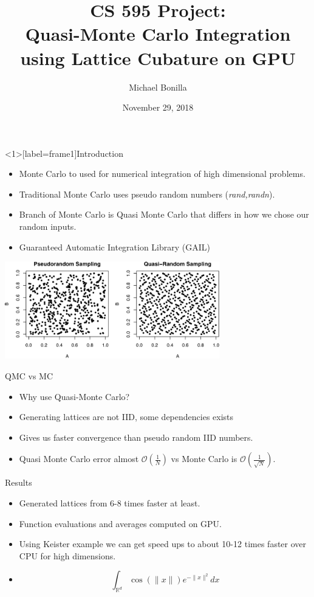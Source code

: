 \documentclass[11pt]{beamer}
\author{Michael Bonilla}
\title{CS 595 Project: \\ Quasi-Monte Carlo Integration using
Lattice Cubature on GPU}
\date{November 29, 2018}
\begin{document}
\nocite{*}
\begin{frame}
\titlepage
\end{frame}


\begin{frame}<1>[label=frame1]{Introduction}
\begin{itemize}
\item Monte Carlo to used for numerical integration of high dimensional problems.
\item Traditional Monte Carlo uses pseudo random numbers (\textit{rand,randn}).
\item Branch of Monte Carlo is Quasi Monte Carlo that differs in how we chose our random inputs.
\item Guaranteed Automatic Integration Library (GAIL)
\end{itemize}
\end{frame}

\begin{frame}
\centering
\includegraphics[width=0.7\textwidth]{pvsq.png} 
\end{frame}

\begin{frame}{QMC vs MC}
\begin{itemize}
\item Why use Quasi-Monte Carlo?
\item Generating lattices are not IID, some dependencies exists
\item Gives us faster convergence than pseudo random IID numbers.
\item Quasi Monte Carlo error almost $\mathcal{O}(\frac{1}{N})$ vs Monte Carlo is $\mathcal{O}(\frac{1}{\sqrt{N}})$.
\end{itemize}
\end{frame}

\begin{frame}{Results}%
\begin{itemize}
\item Generated lattices from 6-8 times faster at least.
\item Function evaluations and averages computed on GPU.
\item Using Keister example we can get speed ups to about 10-12 times faster over CPU for high dimensions.
\item \[ \int_{\mathbb{R}^d}\cos(\|x\|)e^{-\|x\|^2} \textit{d}x\]
\end{itemize}
\end{frame}
\end{document}
